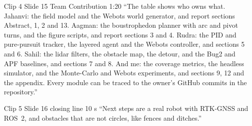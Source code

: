 \documentclass[11pt,a4paper]{article}
\begin{document}
\begin{clipbox}{Clip 4 \textbullet{} Slide 15 Team Contribution \textbullet{} 1:20}
``The table shows who owns what. Jahanvi: the field model and the Webots world generator, and report sections Abstract, 1, 2 and 13. Aagman: the boustrophedon planner with arc and pivot turns, and the figure scripts, and report sections 3 and 4. Rudra: the PID and pure-pursuit tracker, the layered agent and the Webots controller, and sections 5 and 6. Sahil: the lidar filters, the obstacle map, the detour, and the Bug2 and APF baselines, and sections 7 and 8. And me: the coverage metrics, the headless simulator, and the Monte-Carlo and Webots experiments, and sections 9, 12 and the appendix. Every module can be traced to the owner's GitHub commits in the repository.''
\end{clipbox}

\begin{clipbox}{Clip 5 \textbullet{} Slide 16 closing line \textbullet{} 10 s}
``Next steps are a real robot with RTK-GNSS and ROS~2, and obstacles that are not circles, like fences and ditches.''
\end{clipbox}
\end{document}
